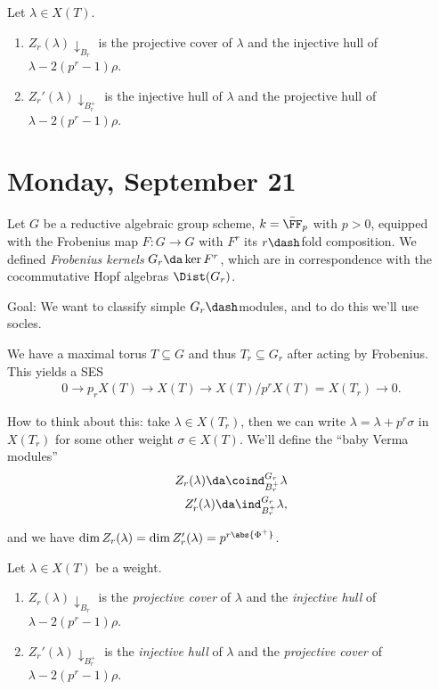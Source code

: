 \begin{proposition}[?]

Let \(\lambda \in X(T)\).

\begin{enumerate}
\def\labelenumi{\arabic{enumi}.}
\tightlist
\item
  \(Z_r(\lambda){\downarrow}_{B_r}\) is the projective cover of
  \(\lambda\) and the injective hull of \(\lambda - 2(p^r-1)\rho\).
\item
  \(Z_r'(\lambda){\downarrow}_{B_r^+}\) is the injective hull of
  \(\lambda\) and the projective hull of \(\lambda - 2(p^r-1)\rho\).
\end{enumerate}

\end{proposition}

\hypertarget{monday-september-21}{%
\section{Monday, September 21}\label{monday-september-21}}

Let \(G\) be a reductive algebraic group scheme, \(k=\bar \FF_p\) with
\(p>0\), equipped with the Frobenius map \(F:G\to G\) with \(F^r\) its
\(r\dash\)fold composition. We defined \emph{Frobenius kernels}
\(G_r \da \ker F^r\), which are in correspondence with the cocommutative
Hopf algebras \(\Dist(G_r)\).

Goal: We want to classify simple \(G_r\dash\)modules, and to do this
we'll use socles.

We have a maximal torus \(T\subseteq G\) and thus \(T_r \subseteq G_r\)
after acting by Frobenius. This yields a SES
\begin{align*}  
0 \to p_r X(T) \to X(T) \to X(T)/p^r X(T) = X(T_r) \to 0
.\end{align*}

How to think about this: take \(\lambda \in X(T_r)\), then we can write
\(\lambda = \lambda + p^r \sigma\) in \(X(T_r)\) for some other weight
\(\sigma \in X(T)\). We'll define the ``baby Verma modules''
\begin{align*}  
Z_r(\lambda) \da \coind_{B_r^+}^{G_r} \lambda \\
Z_r'(\lambda) \da \ind_{B_r^+}^{G_r} \lambda
,\end{align*}

and we have
\(\dim Z_r(\lambda) = \dim Z_r'(\lambda) = p^{r \abs{\Phi^+}}\).

\begin{proposition}[?]

Let \(\lambda\in X(T)\) be a weight.

\begin{enumerate}
\def\labelenumi{\arabic{enumi}.}
\item
  \(Z_r(\lambda)\downarrow_{B_r}\) is the \emph{projective cover} of
  \(\lambda\) and the \emph{injective hull} of
  \(\lambda - 2 (p^r-1) \rho\).
\item
  \(Z_r'(\lambda)\downarrow_{B_r^+}\) is the \emph{injective hull} of
  \(\lambda\) and the \emph{projective cover} of
  \(\lambda - 2 (p^r-1) \rho\).
\end{enumerate}

\end{proposition}

